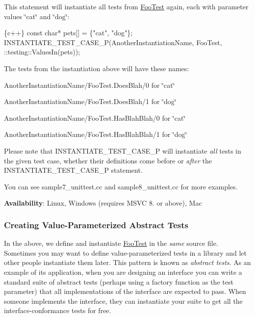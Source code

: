 This statement will instantiate all tests from {\ttfamily \mbox{\hyperlink{class_foo_test}{Foo\+Test}}} again, each with parameter values {\ttfamily \char`\"{}cat\char`\"{}} and {\ttfamily \char`\"{}dog\char`\"{}}\+:


\begin{DoxyCode}
\{c++\}
const char* pets[] = \{"cat", "dog"\};
INSTANTIATE\_TEST\_CASE\_P(AnotherInstantiationName, FooTest,
                        ::testing::ValuesIn(pets));
\end{DoxyCode}


The tests from the instantiation above will have these names\+:


\begin{DoxyItemize}
\item {\ttfamily Another\+Instantiation\+Name/\+Foo\+Test.\+Does\+Blah/0} for {\ttfamily \char`\"{}cat\char`\"{}}
\item {\ttfamily Another\+Instantiation\+Name/\+Foo\+Test.\+Does\+Blah/1} for {\ttfamily \char`\"{}dog\char`\"{}}
\item {\ttfamily Another\+Instantiation\+Name/\+Foo\+Test.\+Has\+Blah\+Blah/0} for {\ttfamily \char`\"{}cat\char`\"{}}
\item {\ttfamily Another\+Instantiation\+Name/\+Foo\+Test.\+Has\+Blah\+Blah/1} for {\ttfamily \char`\"{}dog\char`\"{}}
\end{DoxyItemize}

Please note that {\ttfamily I\+N\+S\+T\+A\+N\+T\+I\+A\+T\+E\+\_\+\+T\+E\+S\+T\+\_\+\+C\+A\+S\+E\+\_\+P} will instantiate {\itshape all} tests in the given test case, whether their definitions come before or {\itshape after} the {\ttfamily I\+N\+S\+T\+A\+N\+T\+I\+A\+T\+E\+\_\+\+T\+E\+S\+T\+\_\+\+C\+A\+S\+E\+\_\+P} statement.

You can see sample7\+\_\+unittest.\+cc and sample8\+\_\+unittest.\+cc for more examples.

{\bfseries Availability}\+: Linux, Windows (requires M\+S\+VC 8. or above), Mac

\subsubsection*{Creating Value-\/\+Parameterized Abstract Tests}

In the above, we define and instantiate {\ttfamily \mbox{\hyperlink{class_foo_test}{Foo\+Test}}} in the {\itshape same} source file. Sometimes you may want to define value-\/parameterized tests in a library and let other people instantiate them later. This pattern is known as {\itshape abstract tests}. As an example of its application, when you are designing an interface you can write a standard suite of abstract tests (perhaps using a factory function as the test parameter) that all implementations of the interface are expected to pass. When someone implements the interface, they can instantiate your suite to get all the interface-\/conformance tests for free.

